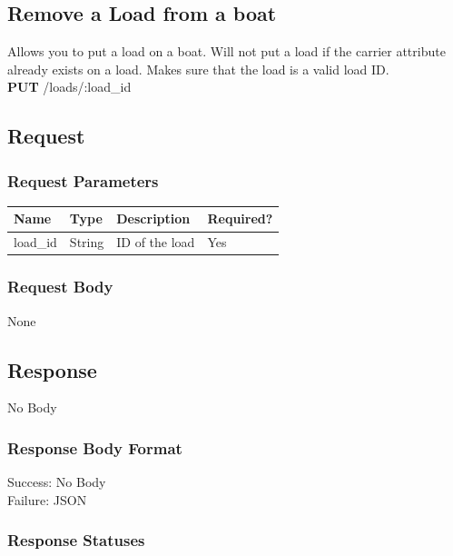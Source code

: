 \documentclass[letterpaper,11pt,titlepage,draftclsnofoot,onecolumn,compsoc,utf8,latin1]{IEEEtran}
\begin{document}
\begin{singlespace}
\section{Remove a Load from a boat}

Allows you to put a load on a boat. Will not put a load if the carrier attribute already exists on a load. Makes sure that the load is a valid load ID.\\

\noindent \textbf{PUT} /loads/:load\_id

\subsection{Request}

\subsubsection{Request Parameters}

\begin{center}
    \begin{tabular}{ | p{} | p{} | p{} | p{} |}
    \hline
        \textbf{Name} & \textbf{Type} & \textbf{Description} &\textbf{Required?}  \\ \hline
        load\_id & String & ID of the load & Yes \\
    \hline
    \end{tabular}
\end{center}

\subsubsection{Request Body}

None

\subsection{Response}

No Body

\subsubsection{Response Body Format}
Success: No Body\\
\noindent Failure: JSON

\subsubsection{Response Statuses}


\end{singlespace}
\end{document}
